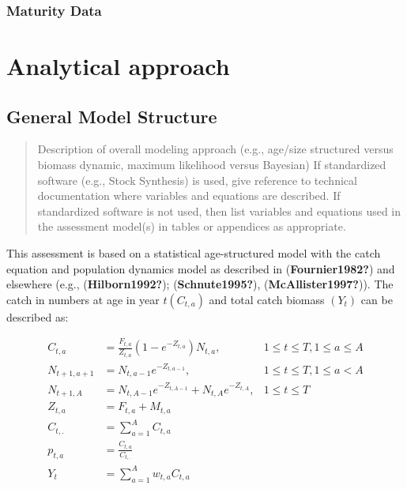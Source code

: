 \documentclass[
  11pt,
]{article}
\begin{document}
\hypertarget{maturity-data}{%
\subsubsection{Maturity Data}\label{maturity-data}}

\hypertarget{analytical-approach}{%
\section{Analytical approach}\label{analytical-approach}}

\hypertarget{general-model-structure}{%
\subsection{General Model Structure}\label{general-model-structure}}

\begin{quote}
Description of overall modeling approach (e.g., age/size structured versus biomass dynamic, maximum likelihood versus Bayesian)
If standardized software (e.g., Stock Synthesis) is used, give reference to technical documentation where variables and equations are described. If standardized software is not used, then list variables and equations used in the assessment model(s) in tables or appendices as appropriate.
\end{quote}

This assessment is based on a statistical age-structured model with the catch equation and population dynamics model as described in (\textbf{Fournier1982?}) and elsewhere (e.g., (\textbf{Hilborn1992?}); (\textbf{Schnute1995?}), (\textbf{McAllister1997?})).
The catch in numbers at age in year \(t (C_{t,a})\) and total catch biomass \((Y_t)\) can be described as:

\begin{align}
    C_{t,a}     &= \frac{F_{t,a}}{Z_{t,a}} \left(1 - e^{-Z_{t,a}}\right) N_{t,a}, &1 \le t \le T, 1 \le a \le A \\
    N_{t+1,a+1} &= N_{t,a-1} e^{-Z_{t,a-1}},                                      &1 \le t \le T, 1 \le a < A   \\
    N_{t+1,A}   &= N_{t,A-1} e^{-Z_{t,A-1}} + N_{t,A} e^{-Z_{t,A}} ,              &1 \le t \le T                \\
    Z_{t,a}     &= F_{t,a} + M_{t,a}                                              &                             \\
    C_{t,.}     &= \sum_{a=1}^A{C_{t,a}}                                          &                             \\
    p_{t,a}     &= \frac{C_{t,a} } {C_{t,.} }                                     &                             \\
    Y_{t}       &= \sum_{a=1}^A{w_{t,a}C_{t,a}}                                   &                             \\
\end{align}
\end{document}
